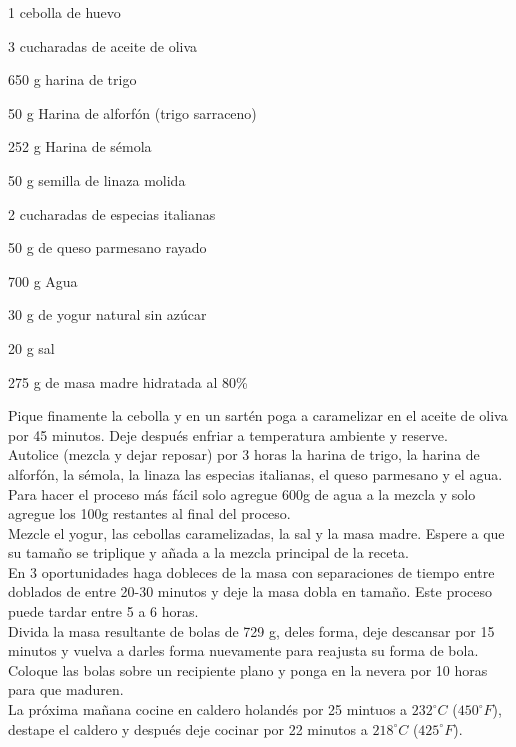 \begin{ingredientes}
\item 1 cebolla de huevo
\item 3 cucharadas de aceite de oliva
\item 650 g harina de trigo
\item 50 g Harina de alforfón (trigo sarraceno)
\item 252 g Harina de sémola
\item 50 g semilla de linaza molida
\item 2 cucharadas de especias italianas
\item 50 g de queso parmesano rayado
\item 700 g Agua
\item 30 g de yogur natural sin azúcar
\item 20 g sal
\item 275 g de masa madre hidratada al 80\% 
\end{ingredientes}

\preparacion

Pique finamente la cebolla y en un sartén poga a caramelizar en el aceite de oliva por 45 minutos. Deje después enfriar a temperatura ambiente y reserve.\\

Autolice (mezcla y dejar reposar) por 3 horas la harina de trigo, la harina de alforfón, la sémola, la linaza las especias italianas, el queso parmesano y el agua. Para hacer el proceso más fácil solo agregue 600g de agua a la mezcla y solo agregue los 100g restantes al final del proceso.\\

Mezcle el yogur, las cebollas caramelizadas, la sal y la masa madre. Espere a que su tamaño se triplique y añada a la mezcla principal de la receta.\\

En 3 oportunidades haga dobleces de la masa con separaciones de tiempo entre doblados de entre 20-30 minutos y deje la masa dobla en tamaño. Este proceso puede tardar entre 5 a 6 horas.\\

Divida la masa resultante de bolas de 729 g, deles forma, deje descansar por 15 minutos y vuelva a darles forma nuevamente para reajusta su forma de bola. Coloque las bolas sobre un recipiente plano y ponga en la nevera por 10 horas para que maduren.\\

La próxima mañana cocine en caldero holandés por 25 mintuos a $232^{\circ}C$ ($450^{\circ}F$), destape el caldero y después deje cocinar por 22 minutos a $218^{\circ}C$ ($425^{\circ}F$).
